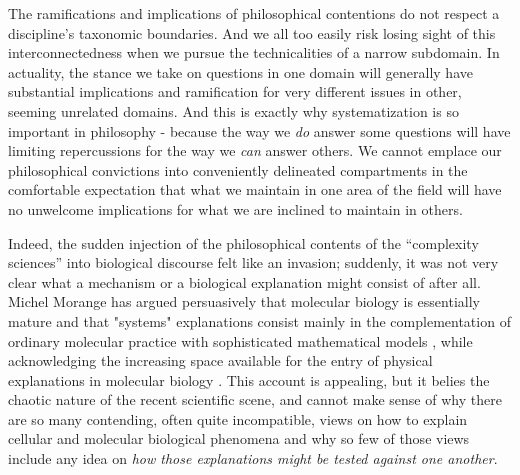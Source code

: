\begin{longquote}
The ramifications and implications of philosophical contentions do not respect a discipline's taxonomic boundaries. And we all too easily risk losing sight of this interconnectedness when we pursue the technicalities of a narrow subdomain. In actuality, the stance we take on questions in one domain will generally have substantial implications and ramification for very different issues in other, seeming unrelated domains. And this is exactly why systematization is so important in philosophy - because the way we \textit{do} answer some questions will have limiting repercussions for the way we \textit{can} answer others. We cannot emplace our philosophical convictions into conveniently delineated compartments in the comfortable expectation that what we maintain in one area of the field will have no unwelcome implications for what we are inclined to maintain in others.
\cite[p.97]{Rescher2005}
\end{longquote}

Indeed, the sudden injection of the philosophical contents of the ``complexity sciences'' into biological discourse felt like an invasion; suddenly, it was not very clear what a mechanism or a biological explanation might consist of after all. Michel Morange has argued persuasively that molecular biology is essentially mature \cite{Morange2003} and that "systems" explanations consist mainly in the complementation of ordinary molecular practice with sophisticated mathematical models \cite{Morange2008}, while acknowledging the increasing space available for the entry of physical explanations in molecular biology \cite{Morange2011}. This account is appealing, but it belies the chaotic nature of the recent scientific scene, and cannot make sense of why there are so many contending, often quite incompatible, views on how to explain cellular and molecular biological phenomena and why so few of those views include any idea on \textit{how those explanations might be tested against one another}.

